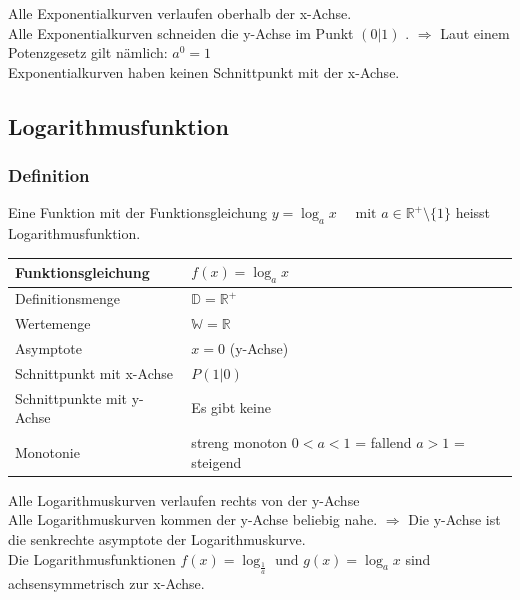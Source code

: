\begin{multicols}{2}
    Alle Exponentialkurven verlaufen oberhalb der x-Achse. \\
    Alle Exponentialkurven schneiden die y-Achse im Punkt $(0|1)$ . $\Longrightarrow$ Laut einem Potenzgesetz gilt nämlich: $a^0 = 1$ \\
    Exponentialkurven haben keinen Schnittpunkt mit der x-Achse.
    \subsection{Logarithmusfunktion}
    \vspace{-4mm}
    \subsubsection{Definition}
    \vspace{-4mm}
    Eine Funktion mit der Funktionsgleichung $y = \log_{a}x \quad \text{ mit } a \in \mathbb{R}^{+}\setminus\{1\}$ heisst Logarithmusfunktion.
    \begin{tabularx}{0.5\textwidth} {
            | >{\raggedright\arraybackslash}X
            | >{\raggedright\arraybackslash}X |}
        \hline
        Funktionsgleichung        & $f(x) = \log_{a}x$                                       \\ \hline
        Definitionsmenge          & $\mathbb{D} = \mathbb{R}^{+}$                            \\ \hline
        Wertemenge                & $\mathbb{W} = \mathbb{R}$                                \\ \hline
        Asymptote                 & $x = 0$ (y-Achse)                                        \\ \hline
        Schnittpunkt mit x-Achse  & $P(1|0)$                                                 \\ \hline
        Schnittpunkte mit y-Achse & Es gibt keine                                            \\ \hline
        Monotonie                 & streng monoton $0 < a < 1$  = fallend $a > 1$ = steigend \\ \hline
    \end{tabularx}

    Alle Logarithmuskurven verlaufen rechts von der y-Achse \\
    Alle Logarithmuskurven kommen der y-Achse beliebig nahe. $\Rightarrow$ Die y-Achse ist die senkrechte asymptote der Logarithmuskurve. \\
    Die Logarithmusfunktionen $f(x) = \log_{\frac{1}{a}}$ und $g(x) = \log_{a}x$ sind achsensymmetrisch zur x-Achse.


\end{multicols}
